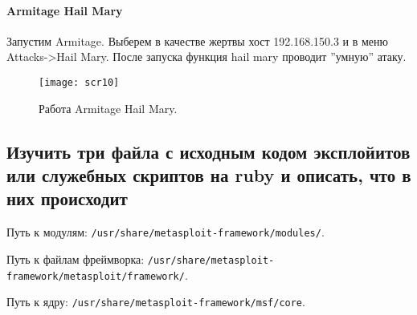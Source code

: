 \documentclass{article}
\begin{document}
 \paragraph{Armitage Hail Mary\\}
 Запустим Armitage. Выберем в качестве жертвы хост 192.168.150.3 и в меню Attacks->Hail Mary. После запуска функция hail mary проводит ”умную” атаку. 
 \begin{figure}[h!]
 	\centering
 	\texttt{[image: scr10]}
 	\caption{Работа Armitage Hail Mary.}
 \end{figure}
 
 \subsection{Изучить три файла с исходным кодом эксплойитов или служебных скриптов на ruby и описать, что в них происходит}
 
 Путь к модулям: \verb'/usr/share/metasploit-framework/modules/'.
 
 Путь к файлам фреймворка: \verb'/usr/share/metasploit-framework/metasploit/framework/'.
 
 Путь к ядру: \verb'/usr/share/metasploit-framework/msf/core'.
 
\end{document}
